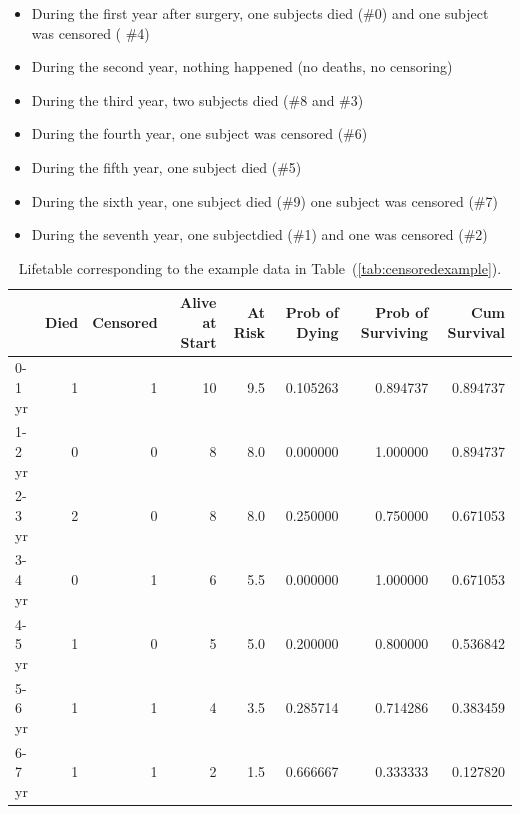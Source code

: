 \documentclass[a4paper,11pt]{article}
\begin{document}
\begin{itemize}[noitemsep]
\item During the first year after surgery, one subjects died (\#0) and one subject was censored ( \#4) 
\item During the second year, nothing happened (no deaths, no censoring)
\item During the third year, two subjects died (\#8 and \#3)
\item During the fourth year, one subject was censored (\#6)
\item During the fifth year, one subject died (\#5)
\item During the sixth year, one subject died (\#9) one subject was censored (\#7)
\item During the seventh year, one subjectdied (\#1) and one was censored (\#2)
\end{itemize}





\begin{table}[tbp]
\begin{center}
\begin{tabular}{lrrrrrrr}
\toprule
{} &  Died &  Censored &  Alive at Start &  At Risk &  Prob of Dying &  Prob of Surviving &  Cum Survival \\
\midrule
0-1 yr &     1 &                1 &              10 &      9.5 &              0.105263 &                  0.894737 &             0.894737 \\
1-2 yr &     0 &                0 &               8 &      8.0 &              0.000000 &                  1.000000 &             0.894737 \\
2-3 yr &     2 &                0 &               8 &      8.0 &              0.250000 &                  0.750000 &             0.671053 \\
3-4 yr &     0 &                1 &               6 &      5.5 &              0.000000 &                  1.000000 &             0.671053 \\
4-5 yr &     1 &                0 &               5 &      5.0 &              0.200000 &                  0.800000 &             0.536842 \\
5-6 yr &     1 &                1 &               4 &      3.5 &              0.285714 &                  0.714286 &             0.383459 \\
6-7 yr &     1 &                1 &               2 &      1.5 &              0.666667 &                  0.333333 &             0.127820 \\
\bottomrule
\end{tabular}
\caption{\label{tab:lifetable} Lifetable corresponding to the example data in Table~(\ref{tab:censoredexample}).}
\end{center}
\end{table}
\end{document}
